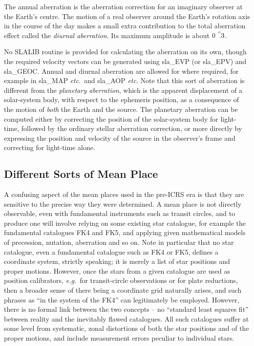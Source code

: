 \documentclass[11pt,twoside,nolof]{starlink}
\providecommand{\arcsec}[2] {\arcseci{#1}$\hspace{-0.4em}.#2$}
\providecommand{\arcseci}[1] {$#1\hspace{-0.05em}$\raisebox{-0.5ex}
                         {$^{'\hspace{-0.1em}'}$}}
\begin{document}
The annual aberration is the aberration correction for
an imaginary observer at the Earth's centre.
The motion of a real observer around the Earth's rotation axis in
the course of the day makes a small extra contribution to the total
aberration effect called the \textit{diurnal aberration}.  Its
maximum amplitude is about \arcsec{0}{3}.

No SLALIB routine is provided for calculating the aberration on
its own, though the required velocity vectors can be
generated using
sla\_EVP (or
sla\_EPV)
and
sla\_GEOC.
Annual and diurnal aberration are allowed for where required, for example in
sla\_MAP
\textit{etc}.\ and
sla\_AOP
\textit{etc}.  Note that this sort
of aberration is different from the \textit{planetary
aberration}, which is the apparent displacement of a solar-system
body, with respect to the ephemeris position, as a consequence
of the motion of \textit{both}\/ the Earth and the source.  The
planetary aberration can be computed either by correcting the
position of the solar-system body for light-time, followed by
the ordinary stellar aberration correction, or more
directly by expressing the position and velocity of the source
in the observer's frame and correcting for light-time alone.

\subsection{Different Sorts of Mean Place}
A confusing aspect of the mean places used in the
pre-ICRS era is that they
are sensitive to the precise way they were determined.  A mean
place is not directly observable, even with fundamental
instruments such as transit circles, and to produce one
will involve relying on some existing star catalogue,
for example the fundamental catalogues FK4 and FK5,
and applying given mathematical models of precession, nutation,
aberration and so on.
Note in particular that no star catalogue,
even a fundamental catalogue such as FK4 or
FK5, defines a coordinate system, strictly speaking;
it is merely a list of star positions and proper motions.
However, once the stars from a given catalogue
are used as position calibrators, \textit{e.g.}\ for
transit-circle observations or for plate reductions, then a
broader sense of there being a coordinate grid naturally
arises, and such phrases as ``in the system of
the FK4'' can legitimately be employed.  However,
there is no formal link between the
two concepts -- no ``standard least squares fit'' between
reality and the inevitably flawed catalogues.
All such
catalogues suffer at some level from systematic, zonal distortions
of both the star positions and of the proper motions,
and include measurement errors peculiar to individual
stars.
\end{document}
